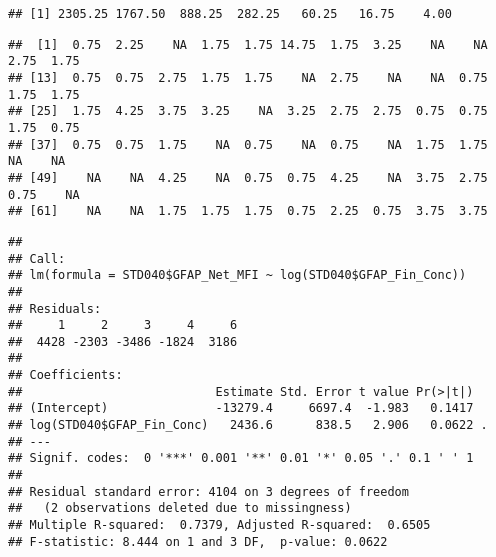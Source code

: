 \documentclass[]{article}
\newenvironment{Shaded}{\begin{snugshade}}{\end{snugshade}}
\newcommand{\CommentTok}[1]{\textcolor[rgb]{0.56,0.35,0.01}{\textit{#1}}}
\newcommand{\KeywordTok}[1]{\textcolor[rgb]{0.13,0.29,0.53}{\textbf{#1}}}
\newcommand{\NormalTok}[1]{#1}
\newcommand{\OperatorTok}[1]{\textcolor[rgb]{0.81,0.36,0.00}{\textbf{#1}}}
\newcommand{\StringTok}[1]{\textcolor[rgb]{0.31,0.60,0.02}{#1}}
\begin{document}
\begin{Shaded}
\end{Shaded}

\begin{verbatim}
## [1] 2305.25 1767.50  888.25  282.25   60.25   16.75    4.00
\end{verbatim}

\begin{Shaded}
\end{Shaded}

\begin{verbatim}
##  [1]  0.75  2.25    NA  1.75  1.75 14.75  1.75  3.25    NA    NA  2.75  1.75
## [13]  0.75  0.75  2.75  1.75  1.75    NA  2.75    NA    NA  0.75  1.75  1.75
## [25]  1.75  4.25  3.75  3.25    NA  3.25  2.75  2.75  0.75  0.75  1.75  0.75
## [37]  0.75  0.75  1.75    NA  0.75    NA  0.75    NA  1.75  1.75    NA    NA
## [49]    NA    NA  4.25    NA  0.75  0.75  4.25    NA  3.75  2.75  0.75    NA
## [61]    NA    NA  1.75  1.75  1.75  0.75  2.25  0.75  3.75  3.75
\end{verbatim}

\begin{Shaded}
\end{Shaded}

\begin{verbatim}
## 
## Call:
## lm(formula = STD040$GFAP_Net_MFI ~ log(STD040$GFAP_Fin_Conc))
## 
## Residuals:
##     1     2     3     4     6 
##  4428 -2303 -3486 -1824  3186 
## 
## Coefficients:
##                           Estimate Std. Error t value Pr(>|t|)  
## (Intercept)               -13279.4     6697.4  -1.983   0.1417  
## log(STD040$GFAP_Fin_Conc)   2436.6      838.5   2.906   0.0622 .
## ---
## Signif. codes:  0 '***' 0.001 '**' 0.01 '*' 0.05 '.' 0.1 ' ' 1
## 
## Residual standard error: 4104 on 3 degrees of freedom
##   (2 observations deleted due to missingness)
## Multiple R-squared:  0.7379, Adjusted R-squared:  0.6505 
## F-statistic: 8.444 on 1 and 3 DF,  p-value: 0.0622
\end{verbatim}
\end{document}
